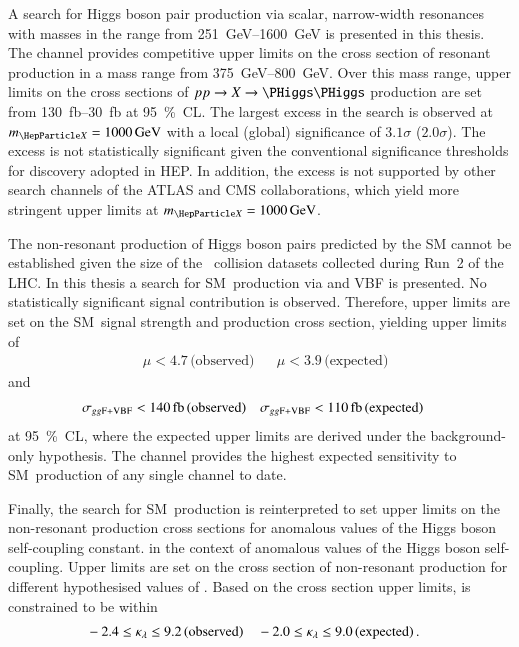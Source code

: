 A search for Higgs boson pair production via scalar, narrow-width resonances
with masses in the range from \SIrange{251}{1600}{\GeV} is presented in this
thesis. The \bbtautau channel provides competitive upper limits on the cross
section of resonant \HH production in a mass range from
\SIrange{375}{800}{\GeV}. Over this mass range, upper limits on the cross
sections of $pp \to X \to \HH$ production are set from
\SIrange{130}{30}{\femto\barn} at \SI{95}{\percent}~CL. The largest excess in
the search is observed at $\mX = \SI{1000}{\GeV}$ with a local (global)
significance of $3.1\sigma$ ($2.0\sigma$). The excess is not statistically
significant given the conventional significance thresholds for discovery adopted
in HEP. In addition, the excess is not supported by other search channels of the
ATLAS and CMS collaborations, which yield more stringent upper limits at
$\mX = \SI{1000}{\GeV}$.


The non-resonant production of Higgs boson pairs predicted by the SM cannot be
established given the size of the \pp~collision datasets collected during Run~2
of the LHC. In this thesis a search for SM~\HH production via \ggF and VBF is
presented. No statistically significant signal contribution is
observed. Therefore, upper limits are set on the SM~\HH signal strength and
production cross section, yielding upper limits of
\begin{align*}
  &\mu  < 4.7 \, \text{(observed)} && \mu < 3.9\,\text{(expected)}
\end{align*}
and
\begin{align*}
  &\xsecggfvbf < \SI{140}{\femto\barn} \,\text{(observed)} && \xsecggfvbf < \SI{110}{\femto\barn} \,\text{(expected)}
\end{align*}
at \SI{95}{\percent}~CL, where the expected upper limits are derived under the
background-only hypothesis. The \bbtautau channel provides the highest expected
sensitivity to SM~\HH production of any single channel to date.




Finally, the search for SM~\HH production is reinterpreted to set upper limits
on the non-resonant \HH production cross sections for anomalous values of the
Higgs boson self-coupling constant.
in the context of
anomalous values of the Higgs boson self-coupling. Upper limits are set on the
cross section of non-resonant \HH production for different hypothesised values
of \klambda. Based on the cross section upper limits, \klambda is constrained to
be within
\begin{align*}
  &-2.4 \leq \kappa_{\lambda} \leq 9.2 \,\text{(observed)} && -2.0 \leq \kappa_{\lambda} \leq 9.0 \,\text{(expected)} \,\text{.}
\end{align*}

